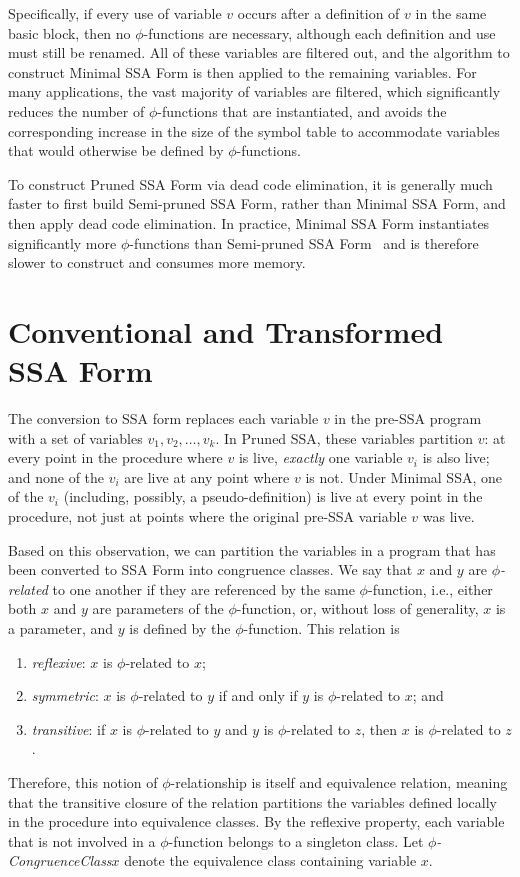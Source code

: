 Specifically, if every use of variable $v$ occurs after
a definition of $v$ in the same basic block, then no
$\phi$-functions are necessary, although each definition
and use must still be renamed. All of these variables
are filtered out, and the algorithm to construct
Minimal SSA Form is then applied to the remaining 
variables. For many applications, the vast majority 
of variables are filtered, which significantly reduces
the number of $\phi$-functions that are instantiated,
and avoids the corresponding increase in the size of the
symbol table to accommodate variables that would otherwise
be defined by $\phi$-functions. 

To construct Pruned SSA Form via dead code elimination,
it is generally much faster to first build Semi-pruned SSA
Form, rather than Minimal SSA Form, and then apply
dead code elimination. In practice, Minimal SSA Form
instantiates significantly more $\phi$-functions than
Semi-pruned SSA Form~\cite{BriggsJul98} and is
therefore slower to construct and consumes more
memory. 

\section{Conventional and Transformed SSA Form}

The conversion to SSA form replaces each variable $v$ in the pre-SSA
program with a set of variables $v_{1}, v_{2}, \ldots, v_{k}$. In Pruned
SSA, these variables partition $v$: at every point in the procedure where $v$ is
live, \emph{exactly} one variable $v_{i}$ is also live; and none of
the $v_{i}$ are live at any point where $v$ is not. Under Minimal SSA, 
one of the $v_{i}$ (including, possibly, a pseudo-definition) is live
at every point in the procedure, not just at points where the original
pre-SSA variable $v$ was live. 

Based on this observation, we can partition the variables in a 
program that has been converted to SSA Form into congruence classes. 
We say that $x$ and $y$ are \emph{$\phi$-related} to one another
if they are referenced by the same $\phi$-function, i.e., 
either both $x$ and $y$ are parameters of the $\phi$-function, or,
without loss of generality, $x$ is a parameter, and $y$ is defined by
the $\phi$-function. This relation is
\begin{enumerate}
\item \emph{reflexive}: $x$ is $\phi$-related to $x$;
\item \emph{symmetric}: $x$ is $\phi$-related to $y$ if and only if
$y$ is $\phi$-related to $x$; and
\item \emph{transitive}: if $x$ is $\phi$-related to $y$ and 
$y$ is $\phi$-related to $z$, then $x$ is $\phi$-related to $z$.
\end{enumerate}
Therefore, this notion of $\phi$-relationship is itself and equivalence
relation, meaning that the transitive closure of the relation partitions
the variables defined locally in the procedure into equivalence classes. 
By the reflexive property, each variable that is not involved in a 
$\phi$-function belongs to a singleton class. 
Let \emph{$\phi$-CongruenceClass${x}$} denote the equivalence class 
containing variable $x$. 

